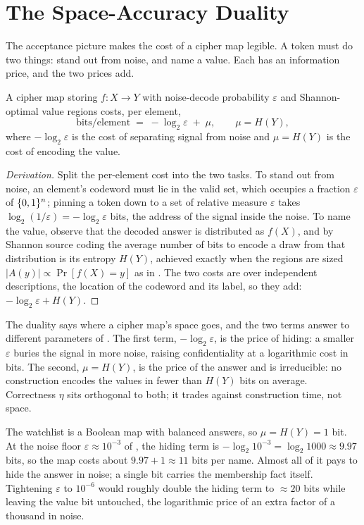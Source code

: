 \section{The Space-Accuracy Duality}
\label{sec:space-duality}

The acceptance picture makes the cost of a cipher map legible. A token must
do two things: stand out from noise, and name a value. Each has an
information price, and the two prices add.

\begin{proposition}
\label{prop:space-duality}
A cipher map storing $f : X \to Y$ with noise-decode probability
$\varepsilon$ and Shannon-optimal value regions costs, per element,
\[
  \text{bits/element} \;=\; -\log_2 \varepsilon \;+\; \mu,
  \qquad \mu = H(Y),
\]
where $-\log_2 \varepsilon$ is the cost of separating signal from noise and
$\mu = H(Y)$ is the cost of encoding the value.
\end{proposition}

\begin{proof}[Derivation]
Split the per-element cost into the two tasks. To stand out from noise, an
element's codeword must lie in the valid set, which occupies a fraction
$\varepsilon$ of $\{0,1\}^n$; pinning a token down to a set of relative measure
$\varepsilon$ takes $\log_2(1/\varepsilon) = -\log_2\varepsilon$ bits, the
address of the signal inside the noise. To name the value, observe that the
decoded answer is distributed as $f(X)$, and by Shannon source coding the
average number of bits to encode a draw from that distribution is its
entropy $H(Y)$, achieved exactly when the regions are sized
$\lvert A(y)\rvert \propto \Pr[f(X) = y]$ as in . The
two costs are over independent descriptions, the location of the codeword
and its label, so they add: $-\log_2\varepsilon + H(Y)$.
\end{proof}

The duality says where a cipher map's space goes, and the two terms answer
to different parameters of . The first term,
$-\log_2\varepsilon$, is the price of hiding: a smaller $\varepsilon$ buries
the signal in more noise, raising confidentiality at a logarithmic cost in
bits. The second, $\mu = H(Y)$, is the price of the answer and is
irreducible: no construction encodes the values in fewer than $H(Y)$ bits on
average. Correctness $\eta$ sits orthogonal to both; it trades against
construction time, not space.

\begin{example}
\label{ex:space-watchlist}
The watchlist is a Boolean map with balanced answers, so $\mu = H(Y) = 1$
bit. At the noise floor $\varepsilon \approx 10^{-3}$ of
, the hiding term is $-\log_2 10^{-3} =
\log_2 1000 \approx 9.97$ bits, so the map costs about $9.97 + 1 \approx 11$
bits per name. Almost all of it pays to hide the answer in noise; a single
bit carries the membership fact itself. Tightening $\varepsilon$ to
$10^{-6}$ would roughly double the hiding term to $\approx 20$ bits while
leaving the value bit untouched, the logarithmic price of an extra factor of
a thousand in noise.
\end{example}

